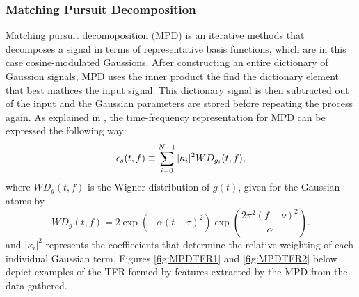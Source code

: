 \documentclass{article}[11pt]
\begin{document}
\subsubsection{Matching Pursuit Decomposition}
\label{sec:MPD}
Matching pursuit decomoposition (MPD) is an iterative methods that decomposes a signal in terms of representative basis functions, which are in this case cosine-modulated Gaussions.  After constructing an entire dictionary of Gaussion signals, MPD uses the inner product the find the dictionary element that best mathces the input signal.  This dictionary signal is then subtracted out of the input and the Gaussian parameters are stored before repeating the process again.  As explained in \cite{Larsen2013}, the time-frequency representation for MPD can be expressed the following way:
\begin{equation}
\uppercase{\epsilon}_s(t,f) \equiv \sum^{N-1}_{i=0} |\kappa_{i}|^{2} WD_{g_{i}}(t,f),
\end{equation}
where $WD_g(t, f)$ is the Wigner distribution of $g(t)$, given for the Gaussian atoms by
\begin{equation}
WD_g(t, f) = 2\exp(-\alpha(t-\tau)^2) \exp\left(\frac{2\pi^2(f-\nu)^2}{\alpha}\right).
\end{equation}
and $|\kappa_{i}|^{2}$ represents the coeffiecients that determine the relative weighting of each individual Gaussian term.
Figures \ref{fig:MPDTFR1} and \ref{fig:MPDTFR2} below depict examples of the TFR formed by features extracted by the MPD from the data gathered.
\end{document}
